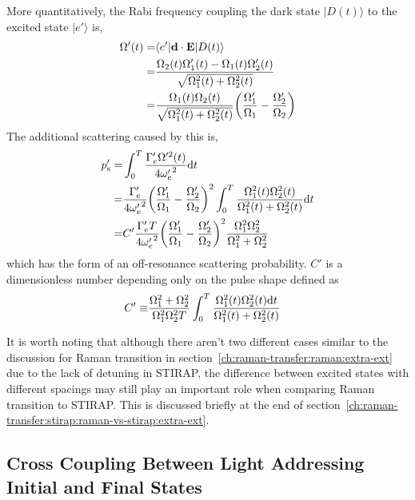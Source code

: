 More quantitatively,
the Rabi frequency coupling the dark state $|D(t)\rangle$ to the excited state $|e'\rangle$ is,
\begin{align*}
  \Omega'(t)=&\langle e'|\mathbf{d}\cdot\mathbf{E}|D(t)\rangle\\
  =&\frac{\Omega_2(t)\Omega'_1(t)-\Omega_1(t)\Omega'_2(t)}{\sqrt{\Omega_1^2(t)+\Omega_2^2(t)}}\\
  =&\frac{\Omega_1(t)\Omega_2(t)}{\sqrt{\Omega_1^2(t)+\Omega_2^2(t)}}{\left({\frac{\Omega'_1}{\Omega_1}-\frac{\Omega'_2}{\Omega_2}}\right)}
\end{align*}
The additional scattering caused by this is,
\begin{align*}
  p'_{\mathrm{s}}=&\int_0^T \frac{\Gamma'_e\Omega'^2(t)}{4{\omega'_e}^2} \mathrm{d} t\\
  =&\frac{\Gamma'_e}{4{\omega'_e}^2}
     {\left({\frac{\Omega'_1}{\Omega_1}-\frac{\Omega'_2}{\Omega_2}}\right)}^2
     \int_0^T \frac{\Omega_1^2(t)\Omega_2^2(t)}{\Omega_1^2(t)+\Omega_2^2(t)} \mathrm{d} t\\
  =&C'\frac{\Gamma'_eT}{4{\omega'_e}^2}
     {\left({\frac{\Omega'_1}{\Omega_1}-\frac{\Omega'_2}{\Omega_2}}\right)}^2
     \frac{\Omega_1^2\Omega_2^2}{\Omega_1^2+\Omega_2^2}
\end{align*}
which has the form of an off-resonance scattering probability.
$C'$ is a dimensionless number depending only on the pulse shape defined as
\begin{align*}
  C'\equiv&\frac{\Omega_1^2+\Omega_2^2}{\Omega_1^2\Omega_2^2T}\int_0^T \frac{\Omega_1^2(t)\Omega_2^2(t)\mathrm{d} t}{\Omega_1^2(t)+\Omega_2^2(t)}
\end{align*}

It is worth noting that although there aren't two different cases similar to
the discussion for Raman transition in section~\ref{ch:raman-transfer:raman:extra-ext}
due to the lack of detuning in STIRAP,
the difference between excited states with different spacings may still play an important role
when comparing Raman transition to STIRAP.
This is discussed briefly at the end of
section~\ref{ch:raman-transfer:stirap:raman-vs-stirap:extra-ext}.

\subsection{Cross Coupling Between Light Addressing Initial and Final States}
\label{ch:raman-transfer:stirap:cross-couple}

